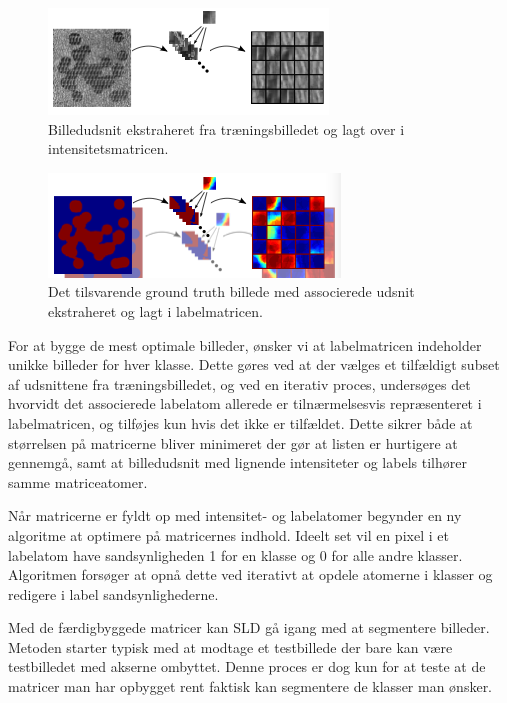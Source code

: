\begin{figure}[H]
		\centering
		\includegraphics[scale=1]{files/postmethod/img/dict_1.png}
	\caption{Billedudsnit ekstraheret fra træningsbilledet og lagt over i intensitetsmatricen. \label{fig:postmethod_intensitydict_init}}
\end{figure}

\begin{figure}[H]
		\centering
		\includegraphics[scale=1]{files/postmethod/img/dict_2.png}
	\caption{Det tilsvarende ground truth billede med associerede udsnit ekstraheret og lagt i labelmatricen.\label{fig:postmethod_labeldict_init}}
\end{figure}

For at bygge de mest optimale billeder, ønsker vi at labelmatricen indeholder unikke billeder for hver klasse. Dette gøres ved at der vælges et tilfældigt subset af udsnittene fra træningsbilledet, og ved en iterativ proces, undersøges det hvorvidt det associerede labelatom allerede er tilnærmelsesvis repræsenteret i labelmatricen, og tilføjes kun hvis det ikke er tilfældet. Dette sikrer både at størrelsen på matricerne bliver minimeret der gør at listen er hurtigere at gennemgå, samt at billedudsnit med lignende intensiteter og labels tilhører samme matriceatomer. 

Når matricerne er fyldt op med intensitet- og labelatomer begynder en ny algoritme at optimere på matricernes indhold. Ideelt set vil en pixel i et labelatom have sandsynligheden 1 for en klasse og 0 for alle andre klasser. Algoritmen forsøger at opnå dette ved iterativt at opdele atomerne i klasser og redigere i label sandsynlighederne. 

Med de færdigbyggede matricer kan SLD gå igang med at segmentere billeder. Metoden starter typisk med at modtage et testbillede der bare kan være testbilledet med akserne ombyttet. Denne proces er dog kun for at teste at de matricer man har opbygget rent faktisk kan segmentere de klasser man ønsker.

